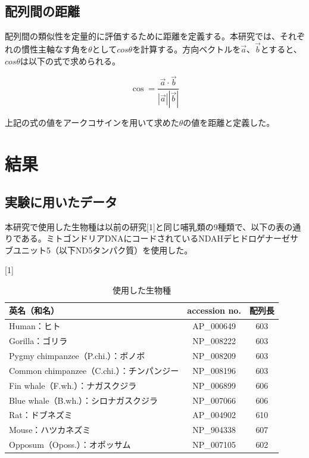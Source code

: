 \documentclass[a4paper,12pt]{jsreport}
\begin{document}
\newpage
\section{配列間の距離}
配列間の類似性を定量的に評価するために距離を定義する。本研究では、それぞれの慣性主軸なす角を$θ$として$cosθ$を計算する。方向ベクトルを$\vec{a}$、$\vec{b}$とすると、$cosθ$は以下の式で求められる。

\begin{equation}
\cos = \frac{\vec{a}\cdot\vec{b}}{|\vec{a}||\vec{b}|}
\end{equation}

上記の式の値をアークコサインを用いて求めた$θ$の値を距離と定義した。


\chapter{結果}

\section{実験に用いたデータ}
本研究で使用した生物種は以前の研究[1]と同じ哺乳類の9種類で、以下の表の通りである。ミトゴンドリアDNAにコードされているNDAHデヒドロゲナーゼサブユニット5（以下ND5タンパク質）を使用した。

\begin{table}[H]
\centering
\caption{使用した生物種}
\scalebox{1}[1]{
\begin{tabular}{|l|c|c|} \hline
英名（和名）& accession no. & 配列長 \\ \hline
Human：ヒト & AP\_000649 & 603 \\[-2mm]
Gorilla：ゴリラ & NP\_008222 & 603 \\[-2mm]
Pygmy chimpanzee（P.chi.）：ボノボ & NP\_008209 & 603 \\[-2mm]
Common chimpanzee（C.chi.）：チンパンジー & NP\_008196 & 603 \\[-2mm]
Fin whale（F.wh.）：ナガスクジラ & NP\_006899 & 606 \\[-2mm]
Blue whale（B.wh.）：シロナガスクジラ & NP\_007066 & 606 \\[-2mm]
Rat：ドブネズミ & AP\_004902 & 610 \\[-2mm]
Mouse：ハツカネズミ  & NP\_904338 & 607 \\[-2mm]
Opposum（Oposs.）：オポッサム & NP\_007105 & 602 \\ \hline
\end{tabular}}
\end{table}
\end{document}
